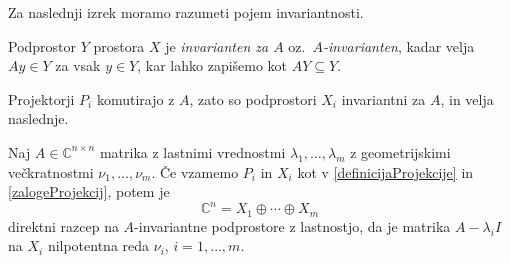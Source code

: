 \documentclass[mat1]{fmfdelo}
\newcommand{\C}{\mathbb C}
\begin{document}
Za naslednji izrek moramo razumeti pojem invariantnosti.
\begin{definicija}
    Podprostor $Y$ prostora $X$ je \emph{invarianten za $A$} oz.\ \emph{$A$-invarianten}, kadar velja $A y \in Y$ za vsak $y \in Y$, kar lahko zapišemo kot $A Y \subseteq Y$.
\end{definicija}
Projektorji $P_i$ komutirajo z $A$, zato so podprostori $X_i$ invariantni za $A$, in velja naslednje. 
\begin{izrek}\label{trditevSpektralniRazcep}
    Naj $A \in \C^{n \times n}$ matrika z lastnimi vrednostmi $\lambda_1, \ldots, \lambda_m$ z geometrijskimi večkratnostmi $\nu_1, \ldots, \nu_m$. Če vzamemo $P_i$ in $X_i$ kot v \eqref{definicijaProjekcije} in \eqref{zalogeProjekcij}, potem je
    \begin{equation}\label{eqSpektralniRazcep}
        \C^n = X_1 \oplus \cdots \oplus X_m
    \end{equation}
    direktni razcep na $A$-invariantne podprostore z lastnostjo, da je matrika $A - \lambda_i I$ na $X_i$ nilpotentna reda $\nu_i$, $i = 1, \ldots, m$.
\end{izrek}
\end{document}
